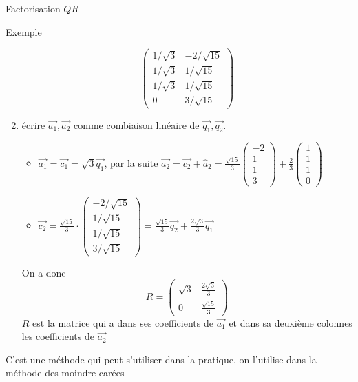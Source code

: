 \begin{parag}{Factorisation $QR$}
\begin{subparag}{Exemple}
\begin{enumerate}
\[\begin{pmatrix}
            1/\sqrt{3} & -2/\sqrt{15}\\
            1/\sqrt{3} & 1/\sqrt{15}\\
            1/\sqrt{3} & 1/\sqrt{15}\\
            0 &3/\sqrt{15}
        \end{pmatrix}\]   
        \item écrire $\vec{a_1}, \vec{a_2}$ comme combiaison linéaire de $\vec{q_1}, \vec{q_2}$.
        \begin{itemize}
            \item $\vec{a_1} = \vec{c_1} = \sqrt{3}\vec{q_1}$, par la suite 
            $\vec{a_2} = \vec{c_2} + \hat{a}_2 = \frac{\sqrt{15}}{3}\begin{pmatrix}
                -2 \\ 1 \\ 1 \\ 3
            \end{pmatrix} + \frac{2}{3}\begin{pmatrix}
                1 \\ 1 \\ 1 \\ 0
            \end{pmatrix}$
            \item $\vec{c_2} = \frac{\sqrt{15}}{3}\cdot\begin{pmatrix}
                -2/\sqrt{15} \\ 1/\sqrt{15} \\ 1/\sqrt{15} \\ 3/\sqrt{15}
            \end{pmatrix} =  \frac{\sqrt{15}}{3}\vec{q_2} + \frac{2\sqrt{3}}{3}\vec{q_1}$
        \end{itemize}
        On a donc 
        \[ R = \begin{pmatrix}
            \sqrt{3} & \frac{2\sqrt{3}}{3}\\
            0 & \frac{\sqrt{15}}{3}
        \end{pmatrix}\]
        $R$ est la matrice qui a dans ses coefficients de $\vec{a_1}$ et dans sa deuxième colonnes les coefficients de $\vec{a_2}$
        \end{enumerate}
        C'est une méthode qui peut s'utiliser dans la pratique, on l'utilise dans la méthode des moindre carées
    \end{subparag}
\end{parag}

